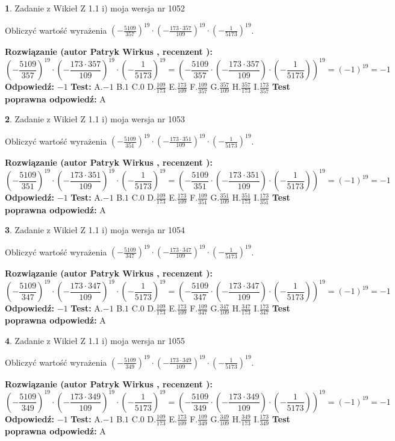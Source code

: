 \documentclass[12pt, a4paper]{article}
\theoremstyle{definition} %
\newtheorem{zad}{}
\newcommand{\zadStart}[1]{\begin{zad}#1\newline}
\newcommand{\zadStop}{\end{zad}}
\newcommand{\rozwStart}[2]{\noindent \textbf{Rozwiązanie (autor #1 , recenzent #2): }\newline}
\newcommand{\rozwStop}{\newline}
\newcommand{\odpStart}{\noindent \textbf{Odpowiedź:}\newline}
\newcommand{\odpStop}{\newline}
\newcommand{\testStart}{\noindent \textbf{Test:}\newline}
\newcommand{\testStop}{\newline}
\newcommand{\kluczStart}{\noindent \textbf{Test poprawna odpowiedź:}\newline}
\newcommand{\kluczStop}{\newline}
\begin{document}
\zadStart{Zadanie z Wikieł Z 1.1 i) moja wersja nr 1052}

Obliczyć wartość wyrażenia $(-\frac{5109}{357})^{19} \cdot (-\frac{173 \cdot 357}{109})^{19} \cdot (-\frac{1}{5173})^{19}$.
\zadStop
\rozwStart{Patryk Wirkus}{}
$$(-\frac{5109}{357})^{19} \cdot (-\frac{173 \cdot 357}{109})^{19} \cdot (-\frac{1}{5173})^{19} = (-\frac{5109}{357} \cdot (-\frac{173 \cdot 357}{109}) \cdot (-\frac{1}{5173}))^{19} = (-1)^{19} = -1$$
\rozwStop
\odpStart
$-1$
\odpStop
\testStart
A.$-1$ B.$1$ C.$0$ D.$\frac{109}{173}$ E.$\frac{173}{109}$
F.$\frac{109}{357}$ G.$\frac{357}{109}$
H.$\frac{357}{173}$
I.$\frac{173}{357}$
\testStop
\kluczStart
A
\kluczStop



\zadStart{Zadanie z Wikieł Z 1.1 i) moja wersja nr 1053}

Obliczyć wartość wyrażenia $(-\frac{5109}{351})^{19} \cdot (-\frac{173 \cdot 351}{109})^{19} \cdot (-\frac{1}{5173})^{19}$.
\zadStop
\rozwStart{Patryk Wirkus}{}
$$(-\frac{5109}{351})^{19} \cdot (-\frac{173 \cdot 351}{109})^{19} \cdot (-\frac{1}{5173})^{19} = (-\frac{5109}{351} \cdot (-\frac{173 \cdot 351}{109}) \cdot (-\frac{1}{5173}))^{19} = (-1)^{19} = -1$$
\rozwStop
\odpStart
$-1$
\odpStop
\testStart
A.$-1$ B.$1$ C.$0$ D.$\frac{109}{173}$ E.$\frac{173}{109}$
F.$\frac{109}{351}$ G.$\frac{351}{109}$
H.$\frac{351}{173}$
I.$\frac{173}{351}$
\testStop
\kluczStart
A
\kluczStop



\zadStart{Zadanie z Wikieł Z 1.1 i) moja wersja nr 1054}

Obliczyć wartość wyrażenia $(-\frac{5109}{347})^{19} \cdot (-\frac{173 \cdot 347}{109})^{19} \cdot (-\frac{1}{5173})^{19}$.
\zadStop
\rozwStart{Patryk Wirkus}{}
$$(-\frac{5109}{347})^{19} \cdot (-\frac{173 \cdot 347}{109})^{19} \cdot (-\frac{1}{5173})^{19} = (-\frac{5109}{347} \cdot (-\frac{173 \cdot 347}{109}) \cdot (-\frac{1}{5173}))^{19} = (-1)^{19} = -1$$
\rozwStop
\odpStart
$-1$
\odpStop
\testStart
A.$-1$ B.$1$ C.$0$ D.$\frac{109}{173}$ E.$\frac{173}{109}$
F.$\frac{109}{347}$ G.$\frac{347}{109}$
H.$\frac{347}{173}$
I.$\frac{173}{347}$
\testStop
\kluczStart
A
\kluczStop



\zadStart{Zadanie z Wikieł Z 1.1 i) moja wersja nr 1055}

Obliczyć wartość wyrażenia $(-\frac{5109}{349})^{19} \cdot (-\frac{173 \cdot 349}{109})^{19} \cdot (-\frac{1}{5173})^{19}$.
\zadStop
\rozwStart{Patryk Wirkus}{}
$$(-\frac{5109}{349})^{19} \cdot (-\frac{173 \cdot 349}{109})^{19} \cdot (-\frac{1}{5173})^{19} = (-\frac{5109}{349} \cdot (-\frac{173 \cdot 349}{109}) \cdot (-\frac{1}{5173}))^{19} = (-1)^{19} = -1$$
\rozwStop
\odpStart
$-1$
\odpStop
\testStart
A.$-1$ B.$1$ C.$0$ D.$\frac{109}{173}$ E.$\frac{173}{109}$
F.$\frac{109}{349}$ G.$\frac{349}{109}$
H.$\frac{349}{173}$
I.$\frac{173}{349}$
\testStop
\kluczStart
A
\kluczStop
\end{document}
